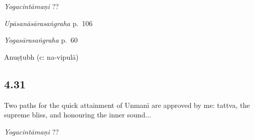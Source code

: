 \begin{ekdosis}
\begin{sources}[hp04_030]
\emph{Yogacintāmaṇi} ??
\begin{versinnote}
\end{versinnote}

\emph{Upāsanāsārasaṅgraha} p.~106
\begin{versinnote}
\end{versinnote}

\emph{Yogasārasaṅgraha} p.~60
\begin{versinnote}
\end{versinnote}
\end{sources}



\begin{metre}[hp04_030]
Anuṣṭubh (c: na-vipulā)
\end{metre}

\subsection*{4.31}
\begin{translation}[hp04_031]
Two paths for the quick attainment of Unmanī are approved by me: tattva, the supreme bliss, and honouring the inner sound...
\end{translation}


\begin{testimonia}[hp04_031]
\emph{Yogacintāmaṇi} ??
\begin{versinnote}
\end{versinnote}


\end{testimonia}
\end{ekdosis}

